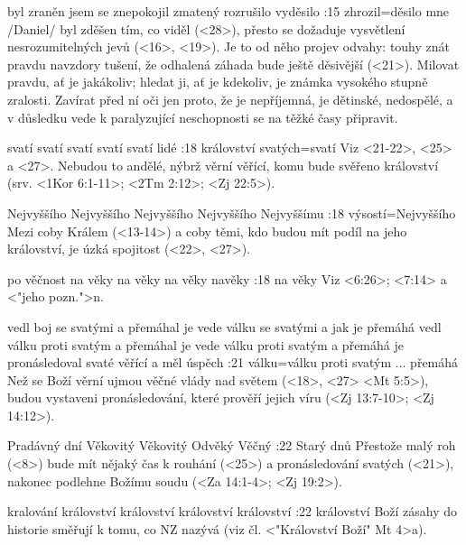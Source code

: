    {byl zraněn}   %
   {jsem se znepokojil}   %
   {zmatený}   %
   {rozrušilo}   %
   {vyděsilo}   %
:15 {zhrozil}={děsilo mne} \x/Daniel/ byl zděšen tím, co viděl (<28>), přesto se dožaduje vysvětlení nesrozumitelných jevů (<16>, <19>). Je to od něho projev odvahy: touhy znát pravdu navzdory tušení, že odhalená záhada bude ještě děsivější (<21>). Milovat pravdu, ať je jakákoliv; hledat ji, ať je kdekoliv, je známka vysokého stupně zralosti. Zavírat před ní oči jen proto, že je nepříjemná, je dětinské, nedospělé, a v důsledku vede k paralyzující neschopnosti se na těžké časy připravit. 

   {svatí}   %
   {svatí}   %
   {svatí}   %
   {svatí}   %
   {svatí lidé}   %
:18 {království svatých}={svatí}  Viz <21-22>, <25> a <27>. Nebudou to andělé, nýbrž věrní věřící, komu bude svěřeno království (srv. <1Kor 6:1-11>; <2Tm 2:12>; <Zj 22:5>). 

   {Nejvyššího}   %
   {Nejvyššího}   %
   {Nejvyššího}   %
   {Nejvyššího}   %
   {Nejvyššímu}   %
:18 {výsostí}={Nejvyššího} Mezi  coby Králem (<13-14>) a  coby těmi, kdo budou mít podíl na jeho království, je úzká spojitost (<22>, <27>).

   {po věčnost}   %
   {na věky}   %
   {na věky}   %
   {na věky}   %
   {navěky}   %
:18 {na věky}  Viz <6:26>;  <7:14> a <"jeho pozn.">n.

   {vedl boj se svatými a přemáhal je}   %
   {vede válku se svatými a jak je přemáhá}   %
   {vedl válku proti svatým a přemáhal je}   %
   {vede válku proti svatým a přemáhá je}   %
   {pronásledoval svaté věřící a měl úspěch}   %
:21 {válku}={válku proti svatým ... přemáhá} Než se Boží věrní ujmou věčné vlády nad světem  (<18>, <27> <Mt 5:5>), budou vystaveni pronásledování, které prověří jejich víru  (<Zj 13:7-10>; <Zj 14:12>).

   {Pradávný dní}   %
   {Věkovitý}   %
   {Věkovitý}   %
   {Odvěký}   %
   {Věčný}   %
:22 {Starý dnů} Přestože malý roh  (<8>) bude mít nějaký čas k rouhání (<25>) a pronásledování svatých (<21>), nakonec podlehne Božímu soudu (<Za 14:1-4>; <Zj 19:2>).

   {kralování}   %
   {království}   %
   {království}   %
   {království}   %
   {království}   %
:22 {království} Boží zásahy do historie směřují k tomu, co NZ nazývá   (viz čl. <"Království Boží" Mt 4>a).

